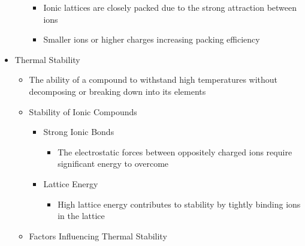 \begin{itemize}
\begin{itemize}
        \begin{itemize}

          \item Ionic lattices are closely packed due to the strong attraction between ions

          \item Smaller ions or higher charges increasing packing efficiency

        \end{itemize}

    \end{itemize}

  \item Thermal Stability

    \begin{itemize}
        
      \item The ability of a compound to withstand high temperatures without decomposing or breaking down into its elements

      \item Stability of Ionic Compounds

        \begin{itemize}

          \item Strong Ionic Bonds

            \begin{itemize}

              \item The electrostatic forces between oppositely charged ions require significant energy to overcome

            \end{itemize}

          \item Lattice Energy

            \begin{itemize}
                
              \item High lattice energy contributes to stability by tightly binding ions in the lattice

            \end{itemize}

        \end{itemize}

      \item Factors Influencing Thermal Stability

        \begin{itemize}


\end{itemize}
\end{itemize}
\end{itemize}
